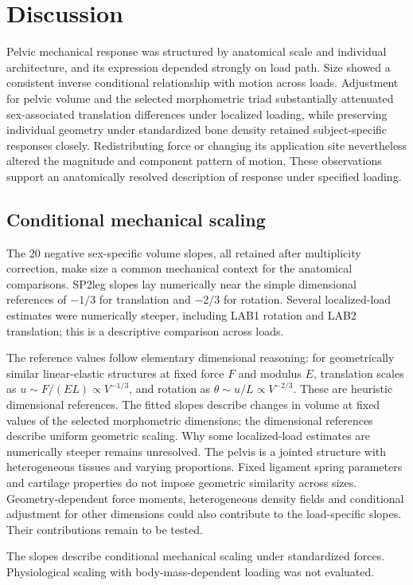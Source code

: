 \section{Discussion}
Pelvic mechanical response was structured by anatomical scale and individual architecture, and its expression depended strongly on load path. Size showed a consistent inverse conditional relationship with motion across loads. Adjustment for pelvic volume and the selected morphometric triad substantially attenuated sex-associated translation differences under localized loading, while preserving individual geometry under standardized bone density retained subject-specific responses closely. Redistributing force or changing its application site nevertheless altered the magnitude and component pattern of motion. These observations support an anatomically resolved description of response under specified loading.

\subsection*{Conditional mechanical scaling}
The 20 negative sex-specific volume slopes, all retained after multiplicity correction, make size a common mechanical context for the anatomical comparisons. SP2leg slopes lay numerically near the simple dimensional references of $-1/3$ for translation and $-2/3$ for rotation. Several localized-load estimates were numerically steeper, including LAB1 rotation and LAB2 translation; this is a descriptive comparison across loads.

The reference values follow elementary dimensional reasoning: for geometrically similar linear-elastic structures at fixed force $F$ and modulus $E$, translation scales as $u\sim F/(EL)\propto V^{-1/3}$, and rotation as $\theta\sim u/L\propto V^{-2/3}$. These are heuristic dimensional references. The fitted slopes describe changes in volume at fixed values of the selected morphometric dimensions; the dimensional references describe uniform geometric scaling. Why some localized-load estimates are numerically steeper remains unresolved. The pelvis is a jointed structure with heterogeneous tissues and varying proportions. Fixed ligament spring parameters and cartilage properties do not impose geometric similarity across sizes. Geometry-dependent force moments, heterogeneous density fields and conditional adjustment for other dimensions could also contribute to the load-specific slopes. Their contributions remain to be tested.

The slopes describe conditional mechanical scaling under standardized forces. Physiological scaling with body-mass-dependent loading was not evaluated.

